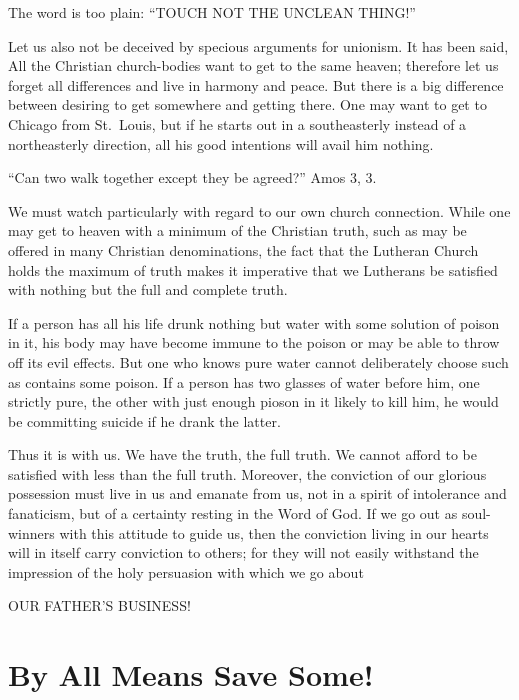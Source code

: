 \documentclass[
]{book}
\begin{document}
The word is too plain: ``TOUCH NOT THE UNCLEAN THING!''

Let us also not be deceived by specious arguments for unionism. It has been said, All the Christian church-bodies want to get to the same heaven; therefore let us forget all differences and live in harmony and peace. But there is a big difference between desiring to get somewhere and getting there. One may want to get to Chicago from St.~Louis, but if he starts out in a southeasterly instead of a northeasterly direction, all his good intentions will avail him nothing.

``Can two walk together except they be agreed?'' Amos 3, 3.

We must watch particularly with regard to our own church connection. While one may get to heaven with a minimum of the Christian truth, such as may be offered in many Christian denominations, the fact that the Lutheran Church holds the maximum of truth makes it imperative that we Lutherans be satisfied with nothing but the full and complete truth.

If a person has all his life drunk nothing but water with some solution of poison in it, his body may have become immune to the poison or may be able to throw off its evil effects. But one who knows pure water cannot deliberately choose such as contains some poison. If a person has two glasses of water before him, one strictly pure, the other with just enough pioson in it likely to kill him, he would be committing suicide if he drank the latter.

Thus it is with us. We have the truth, the full truth. We cannot afford to be satisfied with less than the full truth. Moreover, the conviction of our glorious possession must live in us and emanate from us, not in a spirit of intolerance and fanaticism, but of a certainty resting in the Word of God. If we go out as soul-winners with this attitude to guide us, then the conviction living in our hearts will in itself carry conviction to others; for they will not easily withstand the impression of the holy persuasion with which we go about

\begin{center} OUR FATHER'S BUSINESS! \end{center}

\hypertarget{by-all-means-save-some}{%
\chapter{By All Means Save Some!}\label{by-all-means-save-some}}
\end{document}
